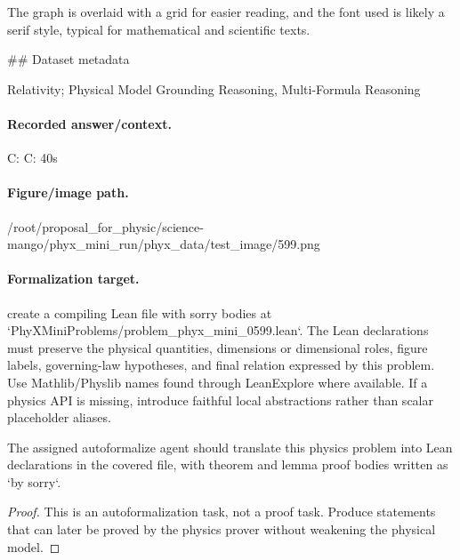 The graph is overlaid with a grid for easier reading, and the font used is likely a serif style, typical for mathematical and scientific texts.

\#\# Dataset metadata

Relativity; Physical Model Grounding Reasoning, Multi-Formula Reasoning

\paragraph{Recorded answer/context.}
C: C: 40s

\paragraph{Figure/image path.}
/root/proposal\_for\_physic/science-mango/phyx\_mini\_run/phyx\_data/test\_image/599.png

\paragraph{Formalization target.}
create a compiling Lean file with sorry bodies at `PhyXMiniProblems/problem\_phyx\_mini\_0599.lean`. The Lean declarations must preserve the physical quantities, dimensions or dimensional roles, figure labels, governing-law hypotheses, and final relation expressed by this problem.
Use Mathlib/Physlib names found through LeanExplore where available. If a physics API is missing, introduce faithful local abstractions rather than scalar placeholder aliases.

\begin{theorem}
\label{thm:physics:phyx_mini_0599:target}
The assigned autoformalize agent should translate this physics problem into Lean declarations in the covered file, with theorem and lemma proof bodies written as `by sorry`.
\end{theorem}
\begin{proof}
This is an autoformalization task, not a proof task. Produce statements that can later be proved by the physics prover without weakening the physical model.
\end{proof}

